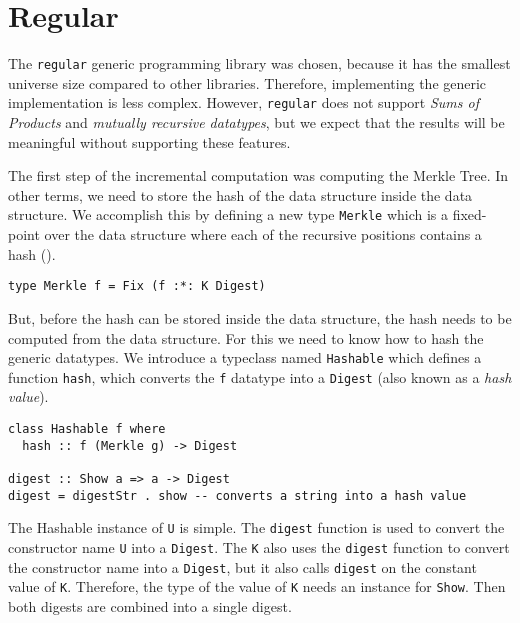 \section{Regular}

The \texttt{regular} generic programming library was chosen, because it has the smallest universe size compared to other libraries. Therefore, implementing the generic implementation is less complex. However, \texttt{regular} does not support \textit{Sums of Products} and \textit{mutually recursive datatypes}, but we expect that the results will be meaningful without supporting these features.


The first step of the incremental computation was computing the Merkle Tree. In other terms, we need to store the hash of the data structure inside the data structure. We accomplish this by defining a new type \texttt{Merkle} which is a fixed-point over the data structure where each of the recursive positions contains a hash ().

\begin{verbatim}
type Merkle f = Fix (f :*: K Digest)
\end{verbatim}

But, before the hash can be stored inside the data structure, the hash needs to be computed from the data structure. For this we need to know how to hash the generic datatypes. We introduce a typeclass named \texttt{Hashable} which defines a function \texttt{hash}, which converts the \texttt{f} datatype into a \texttt{Digest} (also known as a \textit{hash value}).

\begin{verbatim}
class Hashable f where
  hash :: f (Merkle g) -> Digest

digest :: Show a => a -> Digest
digest = digestStr . show -- converts a string into a hash value
\end{verbatim}

The Hashable instance of \texttt{U} is simple. The \texttt{digest} function is used to convert the constructor name \texttt{U} into a \texttt{Digest}. The \texttt{K} also uses the \texttt{digest} function to convert the constructor name into a \texttt{Digest}, but it also calls \texttt{digest} on the constant value of \texttt{K}. Therefore, the type of the value of \texttt{K} needs an instance for \texttt{Show}. Then both digests are combined into a single digest. 


